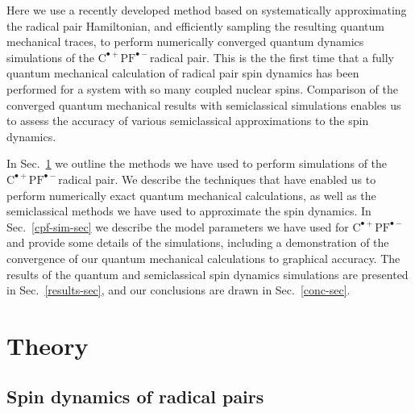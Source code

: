 \documentclass[%
aip,
jcp,%
amsmath,amssymb,
reprint%
]{revtex4-1}
\newcommand{\CPFrp}{$\text{C}^{\bullet +}\text{PF}^{\bullet-}$}
\begin{document}
Here we use a recently developed method based on systematically approximating the radical pair Hamiltonian,\cite{Lindoy2018} and efficiently sampling the resulting quantum mechanical traces,\cite{Lewis2016} to perform numerically converged quantum dynamics simulations of the \CPFrp radical pair. This is the the first time that a fully quantum mechanical calculation of radical pair spin dynamics has been performed for a system with so many coupled nuclear spins. Comparison of the converged quantum mechanical results with semiclassical simulations enables us to assess the accuracy of various semiclassical approximations to the spin dynamics.

In Sec.~\ref{theory-sec} we outline the methods we have used to perform simulations of the \CPFrp radical pair. We describe the techniques that have enabled us to perform numerically exact quantum mechanical calculations, as well as the semiclassical methods we have used to approximate the spin dynamics. In Sec.~\ref{cpf-sim-sec} we describe the model parameters we have used for \CPFrp and provide some details of the simulations, including a demonstration of the convergence of our quantum mechanical calculations to graphical accuracy. The results of the quantum and semiclassical spin dynamics simulations are presented in Sec.~\ref{results-sec}, and our conclusions are drawn in Sec.~\ref{conc-sec}. 

\section{Theory}\label{theory-sec}

\subsection{Spin dynamics of radical pairs}
\end{document}
